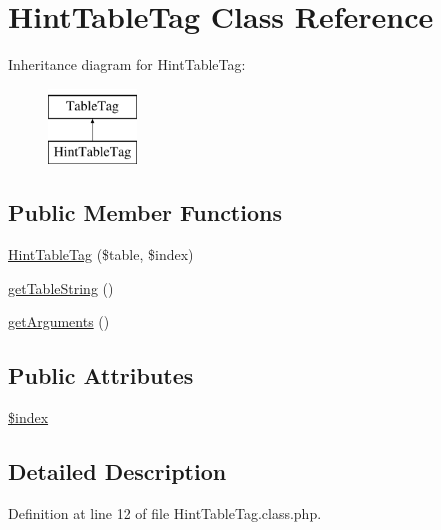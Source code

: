 \hypertarget{classHintTableTag}{\section{Hint\-Table\-Tag Class Reference}
\label{classHintTableTag}
}
Inheritance diagram for Hint\-Table\-Tag\-:\begin{figure}[H]
\begin{center}
\leavevmode
\includegraphics[height=2.000000cm]{classHintTableTag}
\end{center}
\end{figure}
\subsection*{Public Member Functions}
\begin{DoxyCompactItemize}
\item 
\hyperlink{classHintTableTag_ab06d4290d105fc2f64d5a4835aed9130}{Hint\-Table\-Tag} (\$table, \$index)
\item 
\hyperlink{classHintTableTag_a39753285a32f1624ab5df5768ce93cdf}{get\-Table\-String} ()
\item 
\hyperlink{classHintTableTag_a774a5f31c9ceb19dd411a92000066741}{get\-Arguments} ()
\end{DoxyCompactItemize}
\subsection*{Public Attributes}
\begin{DoxyCompactItemize}
\item 
\hyperlink{classHintTableTag_aaed2fb461aff0380f77a16df5d04298c}{\$index}
\end{DoxyCompactItemize}


\subsection{Detailed Description}


Definition at line 12 of file Hint\-Table\-Tag.\-class.\-php.



